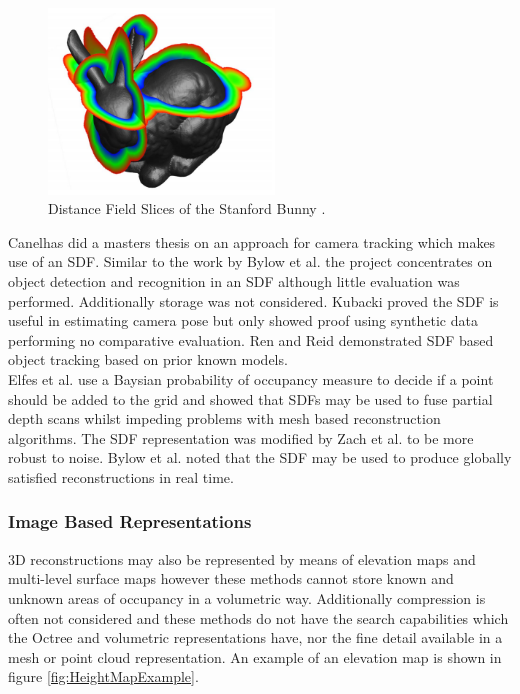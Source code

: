 \begin{figure}[!htb]
\centering
\includegraphics[width=6cm]{images/literature/SDFExample}
\caption{Distance Field Slices of the Stanford Bunny \cite{Sigg03Signed}.}
\label{fig:SDFExample}
\end{figure}

Canelhas \cite{Canelhas12Scene} did a masters thesis on an approach for camera tracking which makes use of an SDF. Similar to the work by Bylow et al. \cite{Bylow13Real} the project concentrates on object detection and recognition in an SDF although little evaluation was performed. Additionally storage was not considered. Kubacki \cite{Kubacki12Registration} proved the SDF is useful in estimating camera pose but only showed proof using synthetic data performing no comparative evaluation. Ren and Reid \cite{Ren12Unified}  demonstrated SDF based object tracking based on prior known models. \\

Elfes et al. \cite{Elfes87Sensor} use a Baysian probability of occupancy measure to decide if a point should be added to the grid and showed that SDFs may be used to fuse partial depth scans whilst impeding problems with mesh based reconstruction algorithms. The SDF representation was modified by Zach et al. \cite{Zach07Globally} to be more robust to noise. Bylow et al. noted that the SDF may be used to produce globally satisfied reconstructions in real time. \\


\subsubsection{Image Based Representations}

3D reconstructions may also be represented by means of elevation maps \cite{Herbert89Terrain} and multi-level surface maps \cite{Triebel06Multi} however these methods cannot store known and unknown areas of occupancy in a volumetric way. Additionally compression is often not considered and these methods do not have the search capabilities which the Octree and volumetric representations have, nor the fine detail available in a mesh or point cloud representation. An example of an elevation map is shown in figure \ref{fig:HeightMapExample}.\\



